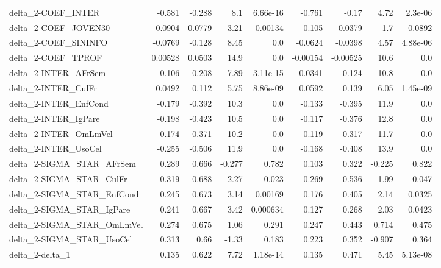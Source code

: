\begin{tabular}{lrrrrrrrr}
delta\_2-COEF\_INTER                    &      -0.581 &       -0.288 &      8.1 & 6.66e-16 &     -0.761 &       -0.17 &         4.72 &       2.3e-06 \\
delta\_2-COEF\_JOVEN30                  &      0.0904 &       0.0779 &     3.21 &  0.00134 &      0.105 &      0.0379 &          1.7 &        0.0892 \\
delta\_2-COEF\_SININFO                  &     -0.0769 &       -0.128 &     8.45 &      0.0 &    -0.0624 &     -0.0398 &         4.57 &      4.88e-06 \\
delta\_2-COEF\_TPROF                    &     0.00528 &       0.0503 &     14.9 &      0.0 &   -0.00154 &    -0.00525 &         10.6 &           0.0 \\
delta\_2-INTER\_AFrSem                  &      -0.106 &       -0.208 &     7.89 & 3.11e-15 &    -0.0341 &      -0.124 &         10.8 &           0.0 \\
delta\_2-INTER\_CulFr                   &      0.0492 &        0.112 &     5.75 & 8.86e-09 &     0.0592 &       0.139 &         6.05 &      1.45e-09 \\
delta\_2-INTER\_EnfCond                 &      -0.179 &       -0.392 &     10.3 &      0.0 &     -0.133 &      -0.395 &         11.9 &           0.0 \\
delta\_2-INTER\_IgPare                  &      -0.198 &       -0.423 &     10.5 &      0.0 &     -0.117 &      -0.376 &         12.8 &           0.0 \\
delta\_2-INTER\_OmLmVel                 &      -0.174 &       -0.371 &     10.2 &      0.0 &     -0.119 &      -0.317 &         11.7 &           0.0 \\
delta\_2-INTER\_UsoCel                  &      -0.255 &       -0.506 &     11.9 &      0.0 &     -0.168 &      -0.408 &         13.9 &           0.0 \\
delta\_2-SIGMA\_STAR\_AFrSem             &       0.289 &        0.666 &   -0.277 &    0.782 &      0.103 &       0.322 &       -0.225 &         0.822 \\
delta\_2-SIGMA\_STAR\_CulFr              &       0.319 &        0.688 &    -2.27 &    0.023 &      0.269 &       0.536 &        -1.99 &         0.047 \\
delta\_2-SIGMA\_STAR\_EnfCond            &       0.245 &        0.673 &     3.14 &  0.00169 &      0.176 &       0.405 &         2.14 &        0.0325 \\
delta\_2-SIGMA\_STAR\_IgPare             &       0.241 &        0.667 &     3.42 & 0.000634 &      0.127 &       0.268 &         2.03 &        0.0423 \\
delta\_2-SIGMA\_STAR\_OmLmVel            &       0.274 &        0.675 &     1.06 &    0.291 &      0.247 &       0.443 &        0.714 &         0.475 \\
delta\_2-SIGMA\_STAR\_UsoCel             &       0.313 &         0.66 &    -1.33 &    0.183 &      0.223 &       0.352 &       -0.907 &         0.364 \\
delta\_2-delta\_1                       &       0.135 &        0.622 &     7.72 & 1.18e-14 &      0.135 &       0.471 &         5.45 &      5.13e-08 \\
\bottomrule
\end{tabular}
